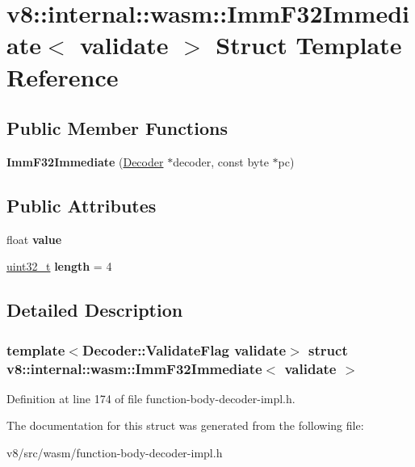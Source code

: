 \hypertarget{structv8_1_1internal_1_1wasm_1_1ImmF32Immediate}{}\section{v8\+:\+:internal\+:\+:wasm\+:\+:Imm\+F32\+Immediate$<$ validate $>$ Struct Template Reference}
\label{structv8_1_1internal_1_1wasm_1_1ImmF32Immediate}
\subsection*{Public Member Functions}
\begin{DoxyCompactItemize}
\item 
\mbox{\label{structv8_1_1internal_1_1wasm_1_1ImmF32Immediate_ad8b18aeea54e5ee8c144d25904ec0804}} 
{\bfseries Imm\+F32\+Immediate} (\mbox{\hyperlink{classv8_1_1internal_1_1wasm_1_1Decoder}{Decoder}} $\ast$decoder, const byte $\ast$pc)
\end{DoxyCompactItemize}
\subsection*{Public Attributes}
\begin{DoxyCompactItemize}
\item 
\mbox{\label{structv8_1_1internal_1_1wasm_1_1ImmF32Immediate_a461965a98de35b6ed2549e97875844ea}} 
float {\bfseries value}
\item 
\mbox{\label{structv8_1_1internal_1_1wasm_1_1ImmF32Immediate_aa021b3ac98ada2d9c44241c9d11fbae0}} 
\mbox{\hyperlink{classuint32__t}{uint32\+\_\+t}} {\bfseries length} = 4
\end{DoxyCompactItemize}


\subsection{Detailed Description}
\subsubsection*{template$<$Decoder\+::\+Validate\+Flag validate$>$\newline
struct v8\+::internal\+::wasm\+::\+Imm\+F32\+Immediate$<$ validate $>$}



Definition at line 174 of file function-\/body-\/decoder-\/impl.\+h.



The documentation for this struct was generated from the following file\+:\begin{DoxyCompactItemize}
\item 
v8/src/wasm/function-\/body-\/decoder-\/impl.\+h\end{DoxyCompactItemize}
